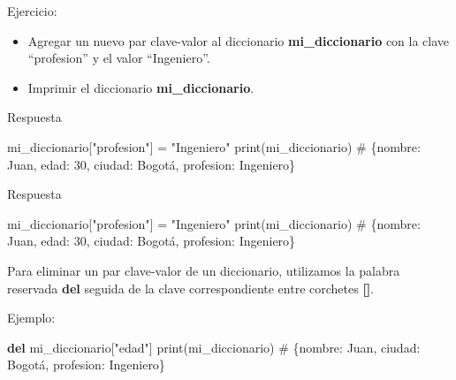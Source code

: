 \documentclass[
  a4paper,
  DIV=11,
  numbers=noendperiod,
  onepage,
  openany]{scrreprt}
\newenvironment{Shaded}{\begin{snugshade}}{\end{snugshade}}
\newcommand{\BuiltInTok}[1]{\textcolor[rgb]{0.00,0.23,0.31}{#1}}
\newcommand{\CommentTok}[1]{\textcolor[rgb]{0.37,0.37,0.37}{#1}}
\newcommand{\KeywordTok}[1]{\textcolor[rgb]{0.00,0.23,0.31}{\textbf{#1}}}
\newcommand{\NormalTok}[1]{\textcolor[rgb]{0.00,0.23,0.31}{#1}}
\newcommand{\OperatorTok}[1]{\textcolor[rgb]{0.37,0.37,0.37}{#1}}
\newcommand{\StringTok}[1]{\textcolor[rgb]{0.13,0.47,0.30}{#1}}
\providecommand{\tightlist}{%
  \setlength{\itemsep}{0pt}\setlength{\parskip}{0pt}}\usepackage{longtable,booktabs,array}
\begin{document}
Ejercicio:

\begin{itemize}
\tightlist
\item
  Agregar un nuevo par clave-valor al diccionario
  \textbf{mi\_diccionario} con la clave ``profesion'' y el valor
  ``Ingeniero''.
\item
  Imprimir el diccionario \textbf{mi\_diccionario}.
\end{itemize}

Respuesta

\begin{Shaded}
\begin{Highlighting}[]
\NormalTok{mi\_diccionario[}\StringTok{"profesion"}\NormalTok{] }\OperatorTok{=} \StringTok{"Ingeniero"}
\BuiltInTok{print}\NormalTok{(mi\_diccionario)  }\CommentTok{\# \{\textquotesingle{}nombre\textquotesingle{}: \textquotesingle{}Juan\textquotesingle{}, \textquotesingle{}edad\textquotesingle{}: 30, \textquotesingle{}ciudad\textquotesingle{}: \textquotesingle{}Bogotá\textquotesingle{}, \textquotesingle{}profesion\textquotesingle{}: \textquotesingle{}Ingeniero\textquotesingle{}\}}
\end{Highlighting}
\end{Shaded}

Respuesta

\begin{Shaded}
\begin{Highlighting}[]
\NormalTok{mi\_diccionario[}\StringTok{"profesion"}\NormalTok{] }\OperatorTok{=} \StringTok{"Ingeniero"}
\BuiltInTok{print}\NormalTok{(mi\_diccionario)  }\CommentTok{\# \{\textquotesingle{}nombre\textquotesingle{}: \textquotesingle{}Juan\textquotesingle{}, \textquotesingle{}edad\textquotesingle{}: 30, \textquotesingle{}ciudad\textquotesingle{}: \textquotesingle{}Bogotá\textquotesingle{}, \textquotesingle{}profesion\textquotesingle{}: \textquotesingle{}Ingeniero\textquotesingle{}\}}
\end{Highlighting}
\end{Shaded}

Para eliminar un par clave-valor de un diccionario, utilizamos la
palabra reservada \textbf{del} seguida de la clave correspondiente entre
corchetes \textbf{{[}{]}}.

Ejemplo:

\begin{Shaded}
\begin{Highlighting}[]
\KeywordTok{del}\NormalTok{ mi\_diccionario[}\StringTok{"edad"}\NormalTok{]}
\BuiltInTok{print}\NormalTok{(mi\_diccionario)  }\CommentTok{\# \{\textquotesingle{}nombre\textquotesingle{}: \textquotesingle{}Juan\textquotesingle{}, \textquotesingle{}ciudad\textquotesingle{}: \textquotesingle{}Bogotá\textquotesingle{}, \textquotesingle{}profesion\textquotesingle{}: \textquotesingle{}Ingeniero\textquotesingle{}\}}
\end{Highlighting}
\end{Shaded}
\end{document}

